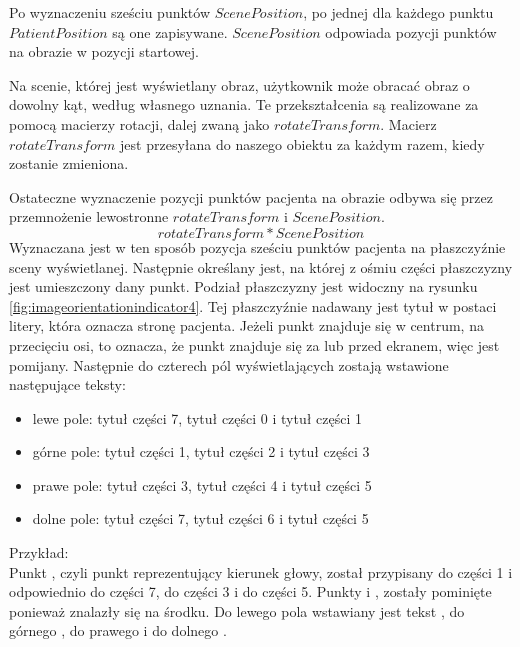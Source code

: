 \par
Po wyznaczeniu sześciu punktów $ScenePosition$, po jednej dla każdego punktu $PatientPosition$ są one zapisywane.
$ScenePosition$ odpowiada pozycji punktów na obrazie w pozycji startowej.

\par
Na scenie, której jest wyświetlany obraz, użytkownik może obracać obraz o dowolny kąt, według własnego uznania.
Te przekształcenia są realizowane za pomocą macierzy rotacji, dalej zwaną jako $rotateTransform$.
Macierz $rotateTransform$ jest przesyłana do naszego obiektu  za każdym razem, kiedy zostanie zmieniona.

\par
Ostateczne wyznaczenie pozycji punktów pacjenta na obrazie odbywa się przez przemnożenie lewostronne $rotateTransform$ i $ScenePosition$.
\[rotateTransform * ScenePosition\]
Wyznaczana jest w ten sposób pozycja sześciu punktów pacjenta na płaszczyźnie sceny wyświetlanej.
Następnie określany jest, na której z ośmiu części płaszczyzny jest umieszczony dany punkt.
Podział płaszczyzny jest widoczny na rysunku \ref{fig:imageorientationindicator4}.
Tej płaszczyźnie nadawany jest tytuł w postaci litery, która oznacza stronę pacjenta.
Jeżeli punkt znajduje się w centrum, na przecięciu osi, to oznacza, że punkt znajduje się za lub przed ekranem, więc jest pomijany.
Następnie do czterech pól wyświetlających zostają wstawione następujące teksty:
\begin{itemize}
    \item lewe pole: tytuł części 7, tytuł części 0 i tytuł części 1
    \item górne pole: tytuł części 1, tytuł części 2 i tytuł części 3
    \item prawe pole: tytuł części 3, tytuł części 4 i tytuł części 5
    \item dolne pole: tytuł części 7, tytuł części 6 i tytuł części 5
\end{itemize}

\par
Przykład:\\
Punkt , czyli punkt reprezentujący kierunek głowy, został przypisany do części 1 i odpowiednio  do części 7,  do części 3 i  do części 5.
Punkty  i , zostały pominięte ponieważ znalazły się na środku.
Do lewego pola wstawiany jest tekst , do górnego , do prawego  i do dolnego .

